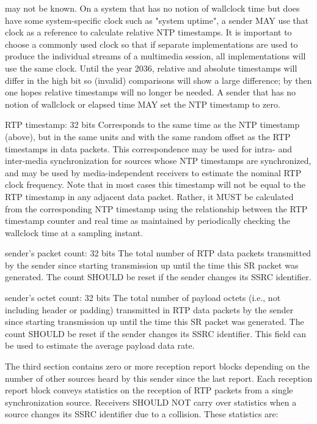 \documentclass{article}
\begin{document}
may not be known.  On a system that has no notion of wallclock time but does have some system-specific clock such as "system uptime", a sender MAY use that clock as a reference to calculate relative NTP timestamps.  It is important to choose a commonly used clock so that if separate implementations are used to produce the individual streams of a multimedia session, all implementations will use the same clock.  Until the year 2036, relative and absolute timestamps will differ in the high bit so (invalid) comparisons will show a large difference; by then one hopes relative timestamps will no longer be needed.  A sender that has no notion of wallclock or elapsed time MAY set the NTP timestamp to zero.

RTP timestamp: 32 bits Corresponds to the same time as the NTP timestamp (above), but in the same units and with the same random offset as the RTP timestamps in data packets.  This correspondence may be used for intra- and inter-media synchronization for sources whose NTP timestamps are synchronized, and may be used by media-independent receivers to estimate the nominal RTP clock frequency.  Note that in most cases this timestamp will not be equal to the RTP timestamp in any adjacent data packet.  Rather, it MUST be calculated from the corresponding NTP timestamp using the relationship between the RTP timestamp counter and real time as maintained by periodically checking the wallclock time at a sampling instant.

sender's packet count: 32 bits The total number of RTP data packets transmitted by the sender since starting transmission up until the time this SR packet was generated.  The count SHOULD be reset if the sender changes its SSRC identifier.

sender's octet count: 32 bits The total number of payload octets (i.e., not including header or padding) transmitted in RTP data packets by the sender since starting transmission up until the time this SR packet was generated.  The count SHOULD be reset if the sender changes its SSRC identifier.  This field can be used to estimate the average payload data rate.

The third section contains zero or more reception report blocks depending on the number of other sources heard by this sender since the last report.  Each reception report block conveys statistics on the reception of RTP packets from a single synchronization source. Receivers SHOULD NOT carry over statistics when a source changes its SSRC identifier due to a collision.  These statistics are:
\end{document}

